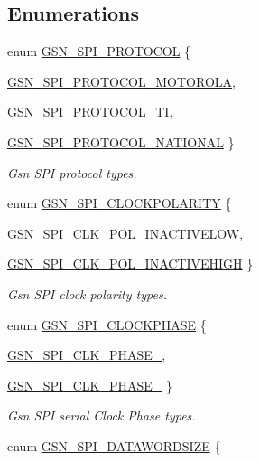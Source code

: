 \subsection*{Enumerations}
\begin{DoxyCompactItemize}
\item 
enum \hyperlink{a00655_gaaabdab9df4e565fb0f07162bb2f22dc4}{GSN\_\-SPI\_\-PROTOCOL} \{ \par
\hyperlink{a00655_ggaaabdab9df4e565fb0f07162bb2f22dc4a49e9fa78d3280c54236b7b4160f22ec2}{GSN\_\-SPI\_\-PROTOCOL\_\-MOTOROLA}, 
\par
\hyperlink{a00655_ggaaabdab9df4e565fb0f07162bb2f22dc4a9728b79e3085a9f2a92a49d7d3e88cea}{GSN\_\-SPI\_\-PROTOCOL\_\-TI}, 
\par
\hyperlink{a00655_ggaaabdab9df4e565fb0f07162bb2f22dc4adc033576463c374bb615509e89dd84e5}{GSN\_\-SPI\_\-PROTOCOL\_\-NATIONAL}
 \}
\begin{DoxyCompactList}\small\item\em Gsn SPI protocol types. \end{DoxyCompactList}\item 
enum \hyperlink{a00655_ga6d27ddbf02c08f4f80f88328bb907f94}{GSN\_\-SPI\_\-CLOCKPOLARITY} \{ \par
\hyperlink{a00655_gga6d27ddbf02c08f4f80f88328bb907f94ab175071e88453ab1b63abe5db3500175}{GSN\_\-SPI\_\-CLK\_\-POL\_\-INACTIVELOW}, 
\par
\hyperlink{a00655_gga6d27ddbf02c08f4f80f88328bb907f94af27b1c22561eb85366ce7e10e0d9e7f5}{GSN\_\-SPI\_\-CLK\_\-POL\_\-INACTIVEHIGH}
 \}
\begin{DoxyCompactList}\small\item\em Gsn SPI clock polarity types. \end{DoxyCompactList}\item 
enum \hyperlink{a00655_gad25e484c9005210b7db2528764be5034}{GSN\_\-SPI\_\-CLOCKPHASE} \{ \par
\hyperlink{a00655_ggad25e484c9005210b7db2528764be5034aab08aff0047af6002867e4d4395f9e86}{GSN\_\-SPI\_\-CLK\_\-PHASE\_}, 
\par
\hyperlink{a00655_ggad25e484c9005210b7db2528764be5034ae00df0dc7e8ab0bb7af357af893ed703}{GSN\_\-SPI\_\-CLK\_\-PHASE\_}
 \}
\begin{DoxyCompactList}\small\item\em Gsn SPI serial Clock Phase types. \end{DoxyCompactList}\item 
enum \hyperlink{a00655_ga52e3e63232981dd9e13226ef140541bf}{GSN\_\-SPI\_\-DATAWORDSIZE} \{ \par

\end{DoxyCompactItemize}
